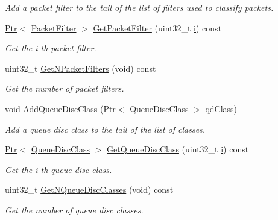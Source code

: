 \begin{DoxyCompactItemize}
\begin{DoxyCompactList}\small\item\em Add a packet filter to the tail of the list of filters used to classify packets. \end{DoxyCompactList}\item 
\hyperlink{classns3_1_1Ptr}{Ptr}$<$ \hyperlink{classns3_1_1PacketFilter}{Packet\+Filter} $>$ \hyperlink{classns3_1_1QueueDisc_a35a230851eabeb444ea7e00798895b42}{Get\+Packet\+Filter} (uint32\+\_\+t \hyperlink{lte__uplink__power__control_8m_a6f6ccfcf58b31cb6412107d9d5281426}{i}) const 
\begin{DoxyCompactList}\small\item\em Get the i-\/th packet filter. \end{DoxyCompactList}\item 
uint32\+\_\+t \hyperlink{classns3_1_1QueueDisc_aff24dd5be3fe3aa46b88c00659e09b23}{Get\+N\+Packet\+Filters} (void) const 
\begin{DoxyCompactList}\small\item\em Get the number of packet filters. \end{DoxyCompactList}\item 
void \hyperlink{classns3_1_1QueueDisc_a153f1f65efcaa976c9a93cd53b777416}{Add\+Queue\+Disc\+Class} (\hyperlink{classns3_1_1Ptr}{Ptr}$<$ \hyperlink{classns3_1_1QueueDiscClass}{Queue\+Disc\+Class} $>$ qd\+Class)
\begin{DoxyCompactList}\small\item\em Add a queue disc class to the tail of the list of classes. \end{DoxyCompactList}\item 
\hyperlink{classns3_1_1Ptr}{Ptr}$<$ \hyperlink{classns3_1_1QueueDiscClass}{Queue\+Disc\+Class} $>$ \hyperlink{classns3_1_1QueueDisc_a584d228f7bff3f754d32793a38134556}{Get\+Queue\+Disc\+Class} (uint32\+\_\+t \hyperlink{lte__uplink__power__control_8m_a6f6ccfcf58b31cb6412107d9d5281426}{i}) const 
\begin{DoxyCompactList}\small\item\em Get the i-\/th queue disc class. \end{DoxyCompactList}\item 
uint32\+\_\+t \hyperlink{classns3_1_1QueueDisc_a8165c6afde992b073bc4d3bb283ed138}{Get\+N\+Queue\+Disc\+Classes} (void) const 
\begin{DoxyCompactList}\small\item\em Get the number of queue disc classes. \end{DoxyCompactList}\item 

\end{DoxyCompactItemize}
